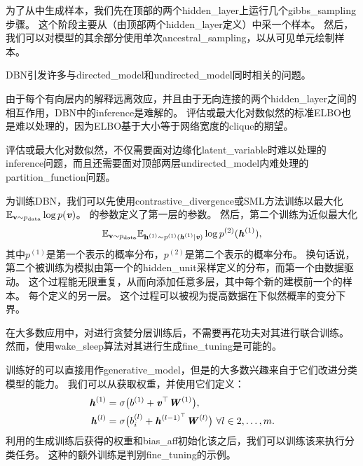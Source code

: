 
为了从中生成样本，我们先在顶部的两个\gls{hidden_layer}上运行几个\gls{gibbs_sampling}步骤。
这个阶段主要从（由顶部两个\gls{hidden_layer}定义）中采一个样本。
然后，我们可以对模型的其余部分使用单次\gls{ancestral_sampling}，以从可见单元绘制样本。

\gls{DBN}引发许多与\gls{directed_model}和\gls{undirected_model}同时相关的问题。

由于每个有向层内的解释远离效应，并且由于无向连接的两个\gls{hidden_layer}之间的相互作用，\gls{DBN}中的\gls{inference}是难解的。
评估或最大化对数似然的标准\gls{ELBO}也是难以处理的，因为\gls{ELBO}基于大小等于网络宽度的\gls{clique}的期望。

评估或最大化对数似然，不仅需要面对边缘化\gls{latent_variable}时难以处理的\gls{inference}问题，而且还需要面对顶部两层\gls{undirected_model}内难处理的\gls{partition_function}问题。

为训练\gls{DBN}，我们可以先使用\gls{contrastive_divergence}或\gls{SML}方法训练以最大化$ \mathbb{E}_{\mathbf{v} \sim p_{\text{data}}} \log p(\boldsymbol{\mathit{v}})$。
的参数定义了第一层的参数。
然后，第二个训练为近似最大化
\begin{align}
 \mathbb{E}_{\mathbf{v} \sim p_{\text{data}}}  \mathbb{E}_{\mathbf{h}^{(1)} \sim p^{(1)}(\boldsymbol{\mathit{h}}^{(1)}  \mid  \boldsymbol{\mathit{v}})}  \log p^{(2)}(\boldsymbol{\mathit{h}}^{(1)}) ,
\end{align}
其中$p^{(1)}$是第一个表示的概率分布，$p^{(2)}$是第二个表示的概率分布。
换句话说，第二个被训练为模拟由第一个的\gls{hidden_unit}采样定义的分布，而第一个由数据驱动。
这个过程能无限重复，从而向添加任意多层，其中每个新的建模前一个的样本。
每个定义的另一层。
这个过程可以被视为提高数据在下似然概率的变分下界\citep{Hinton06}。


在大多数应用中，对进行贪婪分层训练后，不需要再花功夫对其进行联合训练。
然而，使用\gls{wake_sleep}算法对其进行生成\gls{fine_tuning}是可能的。


训练好的可以直接用作\gls{generative_model}，但是的大多数兴趣来自于它们改进分类模型的能力。
我们可以从获取权重，并使用它们定义：
\begin{align}
 \boldsymbol{\mathit{h}}^{(1)} &= \sigma \big( b^{(1)} + \boldsymbol{\mathit{v}}^\top \boldsymbol{\mathit{W}}^{(1)} \big), \\
 \boldsymbol{\mathit{h}}^{(l)} &= \sigma \big( b_i^{(l)} + \boldsymbol{\mathit{h}}^{(l-1)^\top}\boldsymbol{\mathit{W}}^{(l)} \big) ~\forall l \in 2, \ldots, m.
\end{align}
利用的生成训练后获得的权重和\gls{bias_aff}初始化该之后，我们可以训练该来执行分类任务。
这种的额外训练是判别\gls{fine_tuning}的示例。


